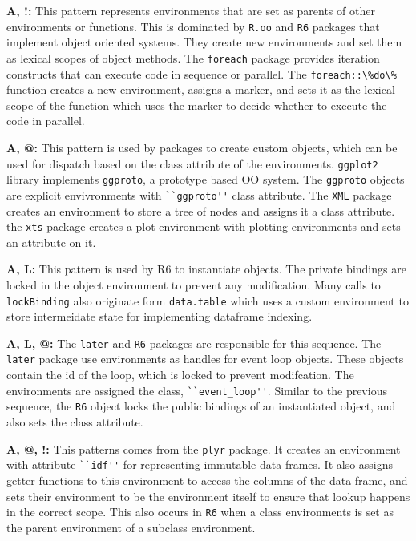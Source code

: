 \documentclass[10pt,review,sigplan,anonymous=true,authorversion=true,nonacm=true]{acmart}
\newcommand{\code}[1]{\lstinline |#1|\xspace}
\begin{document}
\noindent
\textbf{A, !:} This pattern represents environments that are set as
parents of other environments or functions. This is dominated by \code{R.oo}
and \code{R6} packages that implement object oriented systems. They create new
environments and set them as lexical scopes of object methods. The
\code{foreach} package provides iteration constructs that can execute code in
sequence or parallel. The \code{foreach::\%do\%} function creates a new
environment, assigns a marker, and sets it as the lexical scope of the
function which uses the marker to decide whether to execute the code in
parallel.

\noindent
\textbf{A, @:} This pattern is used by packages to create custom objects,
which can be used for dispatch based on the class attribute of the
environments. \code{ggplot2} library implements \code{ggproto}, a prototype
based OO system. The \code{ggproto} objects are explicit envivronments with
\code{``ggproto''} class attribute. The \code{XML} package creates an environment
to store a tree of nodes and assigns it a class attribute. the \code{xts}
package creates a plot environment with plotting environments and sets an
attribute on it.

\noindent
\textbf{A, L:} This pattern is used by R6 to instantiate objects. The
private bindings are locked in the object environment to prevent
any modification. Many calls to \code{lockBinding} also originate form
\code{data.table} which uses a custom environment to store intermeidate state
for implementing dataframe indexing.

\noindent
\textbf{A, L, @:} The \code{later} and \code{R6} packages are responsible
for this sequence. The \code{later} package use environments as handles for
event loop objects. These objects contain the id of the loop, which is locked
to prevent modifcation. The environments are assigned the class,
\code{``event_loop''}. Similar to the previous sequence, the \code{R6} object
locks the public bindings of an instantiated object, and also sets the class
attribute.

\noindent
\textbf{A, @, !:} This patterns comes from the \code{plyr} package. It creates
an environment with attribute \code{``idf''} for representing immutable data
frames. It also assigns getter functions to this environment to access the
columns of the data frame, and sets their environment to be the environment
itself to ensure that lookup happens in the correct scope. This also occurs in
\code{R6} when a class environments is set as the parent environment of a
subclass environment.
\end{document}
